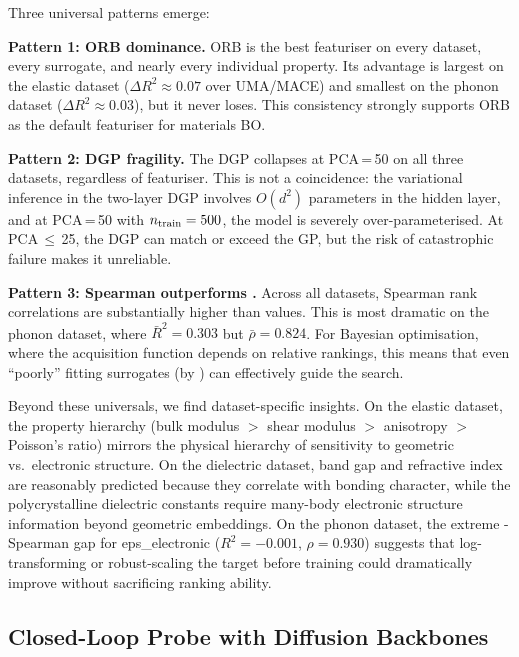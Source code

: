 Three universal patterns emerge:

\textbf{Pattern 1: ORB dominance.}
ORB is the best featuriser on every dataset, every surrogate, and nearly every individual property.
Its advantage is largest on the elastic dataset ($\Delta R^2 \approx 0.07$ over UMA/MACE) and smallest on the phonon dataset ($\Delta R^2 \approx 0.03$), but it never loses.
This consistency strongly supports ORB as the default featuriser for materials BO.

\textbf{Pattern 2: DGP fragility.}
The DGP collapses at PCA\,=\,50 on all three datasets, regardless of featuriser.
This is not a coincidence: the variational inference in the two-layer DGP involves $O(d^2)$ parameters in the hidden layer, and at PCA\,=\,50 with $n_{\text{train}} = 500$, the model is severely over-parameterised.
At PCA\,$\leq$\,25, the DGP can match or exceed the GP, but the risk of catastrophic failure makes it unreliable.

\textbf{Pattern 3: Spearman outperforms \Rtwo{}.}
Across all datasets, Spearman rank correlations are substantially higher than \Rtwo{} values.
This is most dramatic on the phonon dataset, where $\bar{R}^2 = 0.303$ but $\bar{\rho} = 0.824$.
For Bayesian optimisation, where the acquisition function depends on relative rankings, this means that even ``poorly'' fitting surrogates (by \Rtwo{}) can effectively guide the search.

Beyond these universals, we find dataset-specific insights.
On the elastic dataset, the property hierarchy (bulk modulus $>$ shear modulus $>$ anisotropy $>$ Poisson's ratio) mirrors the physical hierarchy of sensitivity to geometric vs.\ electronic structure.
On the dielectric dataset, band gap and refractive index are reasonably predicted because they correlate with bonding character, while the polycrystalline dielectric constants require many-body electronic structure information beyond geometric embeddings.
On the phonon dataset, the extreme \Rtwo{}-Spearman gap for eps\_electronic ($R^2 = -0.001$, $\rho = 0.930$) suggests that log-transforming or robust-scaling the target before training could dramatically improve \Rtwo{} without sacrificing ranking ability.

\FloatBarrier
\subsection{Closed-Loop Probe with Diffusion Backbones}
\label{sec:closed_loop_probe}

